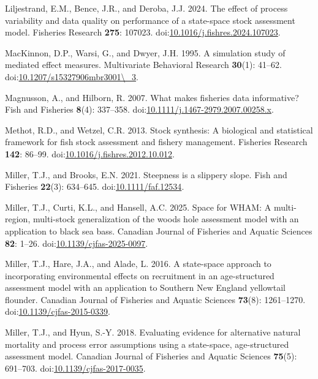 \documentclass[
  12pt,
]{article}
\newlength{\cslhangindent}
\newenvironment{CSLReferences}[2] %
 {\begin{list}{}{%
  \setlength{\itemindent}{0pt}
  \setlength{\leftmargin}{0pt}
  \setlength{\parsep}{0pt}
  \ifodd #1
   \setlength{\leftmargin}{\cslhangindent}
   \setlength{\itemindent}{-1\cslhangindent}
  \fi
  \setlength{\itemsep}{#2\baselineskip}}}
 {\end{list}}
\begin{document}
\begin{CSLReferences}{1}{0}
Liljestrand, E.M., Bence, J.R., and Deroba, J.J. 2024. The effect of
process variability and data quality on performance of a state-space
stock assessment model. Fisheries Research \textbf{275}: 107023.
doi:\href{https://doi.org/10.1016/j.fishres.2024.107023}{10.1016/j.fishres.2024.107023}.

MacKinnon, D.P., Warsi, G., and Dwyer, J.H. 1995. A simulation study of
mediated effect measures. Multivariate Behavioral Research
\textbf{30}(1): 41--62.
doi:\href{https://doi.org/10.1207/s15327906mbr3001/_3}{10.1207/s15327906mbr3001\textbackslash\_3}.

Magnusson, A., and Hilborn, R. 2007. What makes fisheries data
informative? Fish and Fisheries \textbf{8}(4): 337--358.
doi:\href{https://doi.org/10.1111/j.1467-2979.2007.00258.x}{10.1111/j.1467-2979.2007.00258.x}.

Methot, R.D., and Wetzel, C.R. 2013. Stock synthesis: A biological and
statistical framework for fish stock assessment and fishery management.
Fisheries Research \textbf{142}: 86--99.
doi:\href{https://doi.org/10.1016/j.fishres.2012.10.012}{10.1016/j.fishres.2012.10.012}.

Miller, T.J., and Brooks, E.N. 2021. Steepness is a slippery slope. Fish
and Fisheries \textbf{22}(3): 634--645.
doi:\href{https://doi.org/10.1111/faf.12534}{10.1111/faf.12534}.

Miller, T.J., Curti, K.L., and Hansell, A.C. 2025. Space for WHAM: A
multi-region, multi-stock generalization of the woods hole assessment
model with an application to black sea bass. Canadian Journal of
Fisheries and Aquatic Sciences \textbf{82}: 1--26.
doi:\href{https://doi.org/10.1139/cjfas-2025-0097}{10.1139/cjfas-2025-0097}.

Miller, T.J., Hare, J.A., and Alade, L. 2016. A state-space approach to
incorporating environmental effects on recruitment in an age-structured
assessment model with an application to {S}outhern {N}ew {E}ngland
yellowtail flounder. Canadian Journal of Fisheries and Aquatic Sciences
\textbf{73}(8): 1261--1270.
doi:\href{https://doi.org/10.1139/cjfas-2015-0339}{10.1139/cjfas-2015-0339}.

Miller, T.J., and Hyun, S.-Y. 2018. Evaluating evidence for alternative
natural mortality and process error assumptions using a state-space,
age-structured assessment model. Canadian Journal of Fisheries and
Aquatic Sciences \textbf{75}(5): 691--703.
doi:\href{https://doi.org/10.1139/cjfas-2017-0035}{10.1139/cjfas-2017-0035}.


\end{CSLReferences}
\end{document}
